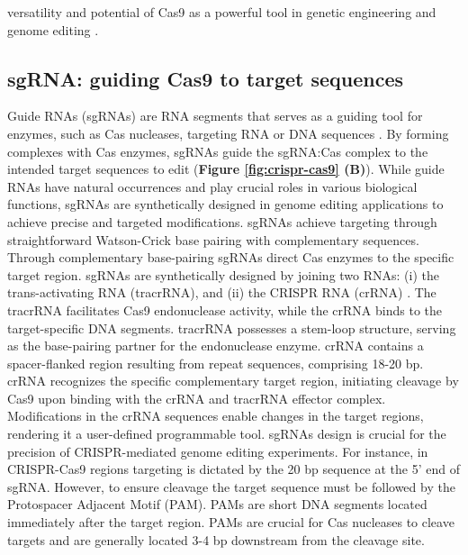 \documentclass[a4paper, titlepage, openright]{book}
\begin{document}
versatility and potential of Cas9 as a powerful tool in genetic engineering and genome editing \citep{ran2013genome}.

\subsection{sgRNA: guiding Cas9 to target sequences}
Guide RNAs (sgRNAs) are RNA segments that serves as a guiding tool for enzymes, such as Cas nucleases, targeting RNA or DNA sequences \citep{ran2013genome}. By forming complexes with Cas enzymes, sgRNAs guide the sgRNA:Cas complex to the intended target sequences to edit (\textbf{Figure \ref{fig:crispr-cas9} (B)}). While guide RNAs have natural occurrences and play crucial roles in various biological functions, sgRNAs are synthetically designed in genome editing applications to achieve precise and targeted modifications. sgRNAs achieve targeting through straightforward Watson-Crick base pairing with complementary sequences. Through complementary base-pairing sgRNAs direct Cas enzymes to the specific target region. sgRNAs are synthetically designed by joining two RNAs: (i) the trans-activating RNA (tracrRNA), and (ii) the  CRISPR RNA (crRNA) \citep{deltcheva2011crispr}. The tracrRNA facilitates Cas9 endonuclease activity, while the crRNA binds to the target-specific DNA segments. tracrRNA possesses a stem-loop structure, serving as the base-pairing partner for the endonuclease enzyme. crRNA contains a spacer-flanked region resulting from repeat sequences, comprising 18-20 bp. crRNA recognizes the specific complementary target region, initiating cleavage by Cas9 upon binding with the crRNA and tracrRNA effector complex. Modifications in the crRNA sequences enable changes in the target regions, rendering it a user-defined programmable tool. sgRNAs design is crucial for the precision of CRISPR-mediated genome editing experiments. For instance, in CRISPR-Cas9 regions targeting is dictated by the 20 bp sequence at the 5' end of sgRNA. However, to ensure cleavage the target sequence must be followed by the Protospacer Adjacent Motif (PAM). PAMs are short DNA segments located immediately after the target region. PAMs are crucial for Cas nucleases to cleave targets and are generally located 3-4 bp downstream from the cleavage site. 

\end{document}
